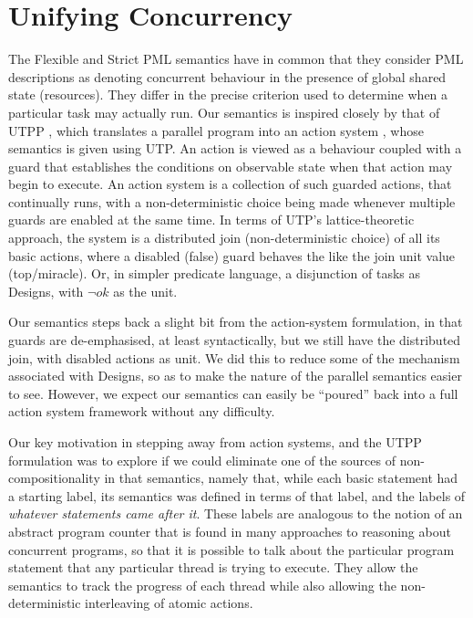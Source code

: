 \section{Unifying Concurrency}\label{ha:UTCP}

The Flexible and Strict PML semantics have in common that they
consider PML descriptions as denoting concurrent behaviour in the
presence of global shared state (resources).
They differ in the precise criterion used to determine when a particular task may actually run.
Our semantics is inspired closely by that of
UTPP \cite{DBLP:conf/icfem/WoodcockH02},
which translates a parallel program into an action system \cite{PODC::BackK1983},
whose semantics is given using UTP.
An action is viewed as a behaviour coupled with a guard that
establishes the conditions on observable state when that action may
begin to execute. An action system is a collection of such guarded actions,
that continually runs, with a non-deterministic choice being made whenever
multiple guards are enabled at the same time\cite{1976:book:dijkstra}.
In terms of UTP's lattice-theoretic approach,
the system is a distributed join (non-deterministic choice) of all its basic actions,
where a disabled (false) guard behaves the like the join unit value (top/miracle).
Or, in simpler predicate language, a disjunction of tasks as Designs,
with $\lnot ok$ as the unit.


Our semantics steps back a slight bit from the action-system formulation,
in that guards are de-emphasised, at least syntactically,
but we still have the distributed join, with disabled actions as unit.
We did this to reduce some of the mechanism associated with Designs,
so as to make the nature of the parallel semantics easier to see.
However, we expect our semantics can easily be ``poured'' back into a
full action system framework without any difficulty.

Our key motivation in stepping away from action systems,
and the UTPP formulation was to explore if we could eliminate one of the
sources of non-compositionality in that semantics,
namely that, while each basic statement had a starting label,
its semantics was defined in terms of that label,
and the labels of \emph{whatever statements came after it}.
These labels are analogous to the notion of an abstract program counter
that is found in many approaches to reasoning about concurrent
programs\cite{DBLP:conf/esop/BattyMNPS15}, so that it is possible to talk about the particular program
statement that any particular thread is trying to execute.
They allow the semantics to track the progress of each thread while
also allowing the non-deterministic interleaving of atomic actions.


